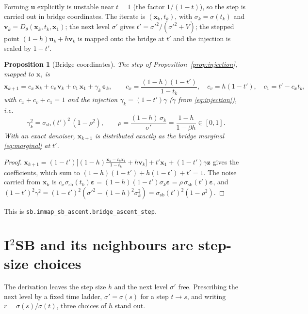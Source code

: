 \documentclass[11pt]{article}
\newtheorem{proposition}{Proposition}
\theoremstyle{definition}
\theoremstyle{remark}
\newcommand{\x}{\bm{x}}
\newcommand{\uu}{\bm{u}}
\newcommand{\vv}{\bm{v}}
\newcommand{\eps}{\bm{\varepsilon}}
\newcommand{\zz}{\bm{z}}
\newcommand{\D}{D_\theta}
\newcommand{\ssb}{\sigma_{\mathrm{sb}}}
\newcommand{\code}[1]{\texttt{#1}}
\begin{document}
Forming $\uu$ explicitly is unstable near $t=1$ (the factor $1/(1-t)$), so the step is carried
out in bridge coordinates. The iterate is $(\x_k, t_k)$, with $\sigma_k = \sigma(t_k)$ and
$\vv_k = \D(\x_k,t_k,\x_1)$; the next level $\sigma'$ gives $t' = \sigma'^2/(\sigma'^2+V)$; the
stepped point $(1-h)\uu_k + h\vv_k$ is mapped onto the bridge at $t'$ and the injection is
scaled by $1-t'$.

\begin{proposition}[Bridge coordinates]\label{prop:bridge_step}
The step of Proposition~\ref{prop:injection}, mapped to $\x$, is
\begin{equation}
  \x_{k+1} = c_x\,\x_k + c_v\,\vv_k + c_1\,\x_1 + \gamma_k\,\eps_k,\qquad
  c_x = \frac{(1-h)(1-t')}{1-t_k},\quad c_v = h(1-t'),\quad c_1 = t' - c_x t_k,
  \label{eq:coeffs}
\end{equation}
with $c_x+c_v+c_1 = 1$ and the injection $\gamma_k = (1-t')\gamma$ ($\gamma$ from
\eqref{eq:injection}), i.e.
\begin{equation}
  \gamma_k^2 = \ssb(t')^2\,(1-\rho^2),\qquad
  \rho = \frac{(1-h)\,\sigma_k}{\sigma'} = \frac{1-h}{1-\beta h}\in[0,1].
  \label{eq:gamma}
\end{equation}
With an exact denoiser, $\x_{k+1}$ is distributed exactly as the bridge marginal
\eqref{eq:marginal} at $t'$.
\end{proposition}
\begin{proof}
$\x_{k+1} = (1-t')\big[(1-h)\tfrac{\x_k - t_k\x_1}{1-t_k} + h\vv_k\big] + t'\x_1 + (1-t')\gamma\zz$
gives the coefficients, which sum to $(1-h)(1-t') + h(1-t') + t' = 1$. The noise carried from
$\x_k$ is $c_x\ssb(t_k)\eps = (1-h)(1-t')\sigma_k\eps = \rho\,\ssb(t')\eps$, and
$(1-t')^2\gamma^2 = (1-t')^2(\sigma'^2 - (1-h)^2\sigma_k^2) = \ssb(t')^2(1-\rho^2)$.
\end{proof}

This is \code{sb.immap\_sb\_ascent.bridge\_ascent\_step}.

\section{I\texorpdfstring{$^2$}{2}SB and its neighbours are step-size choices}\label{sec:family}

The derivation leaves the step size $h$ and the next level $\sigma'$ free. Prescribing the
next level by a fixed time ladder, $\sigma' = \sigma(s)$ for a step $t\to s$, and writing
$r = \sigma(s)/\sigma(t)$, three choices of $h$ stand out.
\end{document}
